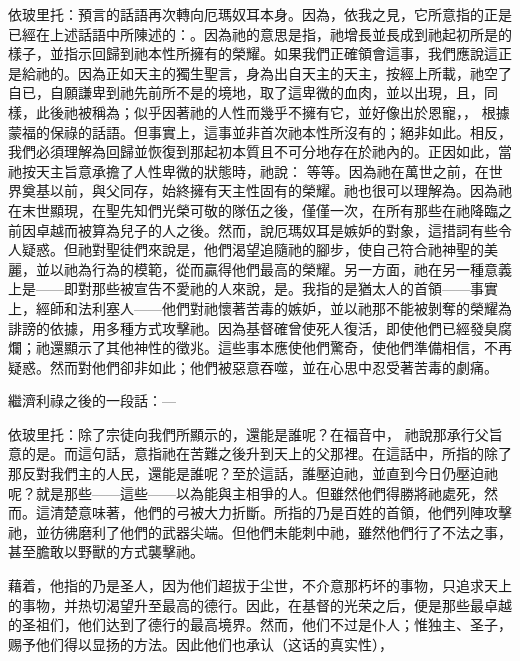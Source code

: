 依玻里托：預言的話語再次轉向厄瑪奴耳本身。因為，依我之見，它所意指的正是已經在上述話語中所陳述的：。因為祂的意思是指，祂增長並長成到祂起初所是的樣子，並指示回歸到祂本性所擁有的榮耀。如果我們正確領會這事，我們應說這正是給祂的。因為正如天主的獨生聖言，身為出自天主的天主，按經上所載，祂空了自已，自願謙卑到祂先前所不是的境地，取了這卑微的血肉，並以出現，且，同樣，此後祂被稱為；似乎因著祂的人性而幾乎不擁有它，並好像出於恩寵，， 根據蒙福的保祿的話語。但事實上，這事並非首次祂本性所沒有的；絕非如此。相反，我們必須理解為回歸並恢復到那起初本質且不可分地存在於祂內的。正因如此，當祂按天主旨意承擔了人性卑微的狀態時，祂說：  等等。因為祂在萬世之前，在世界奠基以前，與父同存，始終擁有天主性固有的榮耀。祂也很可以理解為。因為祂在末世顯現，在聖先知們光榮可敬的隊伍之後，僅僅一次，在所有那些在祂降臨之前因卓越而被算為兒子的人之後。然而，說厄瑪奴耳是嫉妒的對象，這措詞有些令人疑惑。但祂對聖徒們來說是，他們渴望追隨祂的腳步，使自己符合祂神聖的美麗，並以祂為行為的模範，從而贏得他們最高的榮耀。另一方面，祂在另一種意義上是——即對那些被宣告不愛祂的人來說，是。我指的是猶太人的首領——事實上，經師和法利塞人——他們對祂懷著苦毒的嫉妒，並以祂那不能被剝奪的榮耀為誹謗的依據，用多種方式攻擊祂。因為基督確曾使死人復活，即使他們已經發臭腐爛；祂還顯示了其他神性的徵兆。這些事本應使他們驚奇，使他們準備相信，不再疑惑。然而對他們卻非如此；他們被惡意吞噬，並在心思中忍受著苦毒的劇痛。\par

繼濟利祿之後的一段話：—\par

依玻里托：除了宗徒向我們所顯示的，還能是誰呢？在福音中， 祂說那承行父旨意的是。而這句話，意指祂在苦難之後升到天上的父那裡。在這話中，所指的除了那反對我們主的人民，還能是誰呢？至於這話，誰壓迫祂，並直到今日仍壓迫祂呢？就是那些——這些——以為能與主相爭的人。但雖然他們得勝將祂處死，然而。這清楚意味著，他們的弓被大力折斷。所指的乃是百姓的首領，他們列陣攻擊祂，並彷彿磨利了他們的武器尖端。但他們未能刺中祂，雖然他們行了不法之事，甚至膽敢以野獸的方式襲擊祂。\par

藉着，他指的乃是圣人，因为他们超拔于尘世，不介意那朽坏的事物，只追求天上的事物，并热切渴望升至最高的德行。因此，在基督的光荣之后，便是那些最卓越的圣祖们，他们达到了德行的最高境界。然而，他们不过是仆人；惟独主、圣子，赐予他们得以显扬的方法。因此他们也承认（这话的真实性），\par

